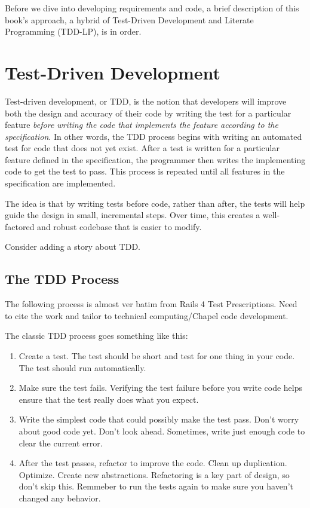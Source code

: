 \label{Development_Approach}

Before we dive into developing requirements and code, a brief description of this book's approach, a hybrid of 
Test-Driven Development and Literate Programming (TDD-LP), is in order.

\section{Test-Driven Development}
Test-driven development, or TDD, is the notion that developers will improve both the design and
accuracy of their code by writing the test for a particular feature \textit{before writing the 
code that implements the feature according to the specification}. In other words, the TDD process 
begins with writing an automated test for code that does not yet 
exist. After a test is written for a particular feature defined in the specification, the 
programmer then writes the implementing code to get the test to pass. This process is repeated until
all features in the specification are implemented. 

The idea is that by writing tests before code, rather than after, the tests will help guide
the design in small, incremental steps. Over time, this creates a well-factored and robust
codebase that is easier to modify.

\begin{TODO}
Consider adding a story about TDD.
\end{TODO}

\subsection{The TDD Process}
\begin{TODO} The following process is almost ver batim from Rails 4 Test Prescriptions. Need to 
cite the work and tailor to technical computing/Chapel code development.
\end{TODO}
The classic TDD process goes something like this:
\begin{enumerate}
\item Create a test. The test should be short and test for one thing in your code. The test
should run automatically.
\item Make sure the test fails. Verifying the test failure before you write code helps ensure
that the test really does what you expect.
\item Write the simplest code that could possibly make the test pass. Don't worry about good
code yet. Don't look ahead. Sometimes, write just enough code to clear the current error.
\item After the test passes, refactor to improve the code. Clean up duplication. Optimize.
Create new abstractions. Refactoring is a key part of design, so don't skip this. Remmeber to
run the tests again to make sure you haven't changed any behavior.
\end{enumerate}

